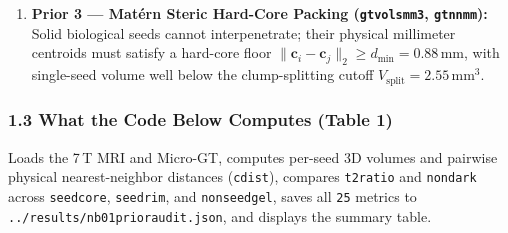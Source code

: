 \documentclass[10pt,a4paper]{article}
\renewcommand{\_}{\origunderscore\allowbreak}
\begin{document}
\begin{enumerate}
\[
B_{\text{non\_dark}}(\mathbf{x}) = \max\!\left(\operatorname{clip}\!\left(\frac{r_{T_2}(\mathbf{x}) - 0.82}{0.15},\, 0,\, 1\right),\; \operatorname{clip}\!\left(\frac{0.32 - E_{\text{local}}(\mathbf{x})}{0.10},\, 0,\, 1\right)\right).
\]
\textbf{Why we explicitly audit \texttt{seed\_core} vs. 1-voxel \texttt{seed\_rim}:} Because $\Delta z = 0.50\,\text{mm}$ is $2.13\times$ thicker than in-plane spacing, boundary voxels mix dark seed ($r_{T_2} \approx 0.12$) and bright gel ($r_{T_2} \approx 0.90$) by partial-volume averaging $I_{\text{PV}} = \alpha I_{\text{seed}} + (1 - \alpha) I_{\text{gel}}$ (yielding $\approx 0.51$ for a 50/\allowbreak{}50 voxel). Dilating the GT mask by 1 voxel (\texttt{seed\_rim = binary\_dilation(seed\_core) \& \textasciitilde{}seed\_core}) verifies that placing the ramp onset at $0.82$ protects $100\%$ of seed cores and $>93\%$ of partial-volume rims from boundary erosion!
\item \textbf{Prior 3 --- Mat\'ern Steric Hard-Core Packing (\texttt{gt\_vols\_mm3}, \texttt{gt\_nn\_mm}):} Solid biological seeds cannot interpenetrate; their physical millimeter centroids must satisfy a hard-core floor $\|\mathbf{c}_i - \mathbf{c}_j\|_2 \ge d_{\min} = 0.88\,\text{mm}$, with single-seed volume well below the clump-splitting cutoff $V_{\text{split}} = 2.55\,\text{mm}^3$.
\end{enumerate}

\subsubsection*{1.3 What the Code Below Computes (Table 1)}
Loads the 7\,T MRI and Micro-GT, computes per-seed 3D volumes and pairwise physical nearest-neighbor distances (\texttt{cdist}), compares \texttt{t2\_ratio} and \texttt{non\_dark} across \texttt{seed\_core}, \texttt{seed\_rim}, and \texttt{non\_seed\_gel}, saves all \texttt{25} metrics to \texttt{../\allowbreak{}results/\allowbreak{}nb01\_prior\_audit.json}, and displays the summary table.
\end{document}
